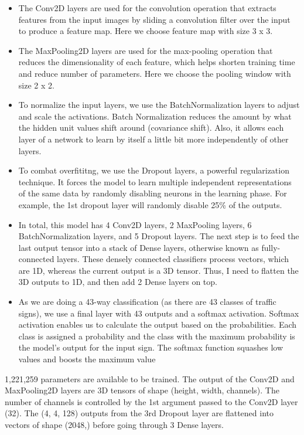 \documentclass[
  11pt,
]{article}
\begin{document}
\begin{itemize}
\item
  The Conv2D layers are used for the convolution operation that extracts
  features from the input images by sliding a convolution filter over
  the input to produce a feature map. Here we choose feature map with
  size 3 x 3.
\item
  The MaxPooling2D layers are used for the max-pooling operation that
  reduces the dimensionality of each feature, which helps shorten
  training time and reduce number of parameters. Here we choose the
  pooling window with size 2 x 2.
\item
  To normalize the input layers, we use the BatchNormalization layers to
  adjust and scale the activations. Batch Normalization reduces the
  amount by what the hidden unit values shift around (covariance shift).
  Also, it allows each layer of a network to learn by itself a little
  bit more independently of other layers.
\item
  To combat overfititng, we use the Dropout layers, a powerful
  regularization technique. It forces the model to learn multiple
  independent representations of the same data by randomly disabling
  neurons in the learning phase. For example, the 1st dropout layer will
  randomly disable 25\% of the outputs.
\item
  In total, this model has 4 Conv2D layers, 2 MaxPooling layers, 6
  BatchNormalization layers, and 5 Dropout layers. The next step is to
  feed the last output tensor into a stack of Dense layers, otherwise
  known as fully-connected layers. These densely connected classifiers
  process vectors, which are 1D, whereas the current output is a 3D
  tensor. Thus, I need to flatten the 3D outputs to 1D, and then add 2
  Dense layers on top.
\item
  As we are doing a 43-way classification (as there are 43 classes of
  traffic signs), we use a final layer with 43 outputs and a softmax
  activation. Softmax activation enables us to calculate the output
  based on the probabilities. Each class is assigned a probability and
  the class with the maximum probability is the model's output for the
  input sign. The softmax function squashes low values and boosts the
  maximum value
\end{itemize}

1,221,259 parameters are available to be trained. The output of the
Conv2D and MaxPooling2D layers are 3D tensors of shape (height, width,
channels). The number of channels is controlled by the 1st argument
passed to the Conv2D layer (32). The (4, 4, 128) outputs from the 3rd
Dropout layer are flattened into vectors of shape (2048,) before going
through 3 Dense layers.
\end{document}
